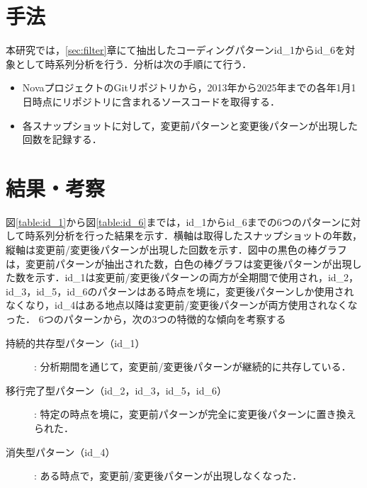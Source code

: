 \documentclass[11pt]{jreport}
\begin{document}
\section{手法}
本研究では，\ref{sec:filter}章にて抽出したコーディングパターンid\_1からid\_6を対象として時系列分析を行う．分析は次の手順にて行う．
\begin{itemize}
    \item NovaプロジェクトのGitリポジトリから，2013年から2025年までの各年1月1日時点にリポジトリに含まれるソースコードを取得する．
    \item 各スナップショットに対して，変更前パターンと変更後パターンが出現した回数を記録する．
\end{itemize}

\section{結果・考察}
図\ref{table:id_1}から図\ref{table:id_6}までは，id\_1からid\_6までの6つのパターンに対して時系列分析を行った結果を示す．横軸は取得したスナップショットの年数，縦軸は変更前/変更後パターンが出現した回数を示す．図中の黒色の棒グラフは，変更前パターンが抽出された数，白色の棒グラフは変更後パターンが出現した数を示す．id\_1は変更前/変更後パターンの両方が全期間で使用され，id\_2，id\_3，id\_5，id\_6のパターンはある時点を境に，変更後パターンしか使用されなくなり，id\_4はある地点以降は変更前/変更後パターンが両方使用されなくなった．
6つのパターンから，次の3つの特徴的な傾向を考察する
\begin{description}
    \item[持続的共存型パターン（id\_1）]: 分析期間を通じて，変更前/変更後パターンが継続的に共存している．
    \item[移行完了型パターン（id\_2，id\_3，id\_5，id\_6）]: 特定の時点を境に，変更前パターンが完全に変更後パターンに置き換えられた．
    \item[消失型パターン（id\_4）]: ある時点で，変更前/変更後パターンが出現しなくなった．
\end{description}
\end{document}
